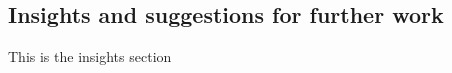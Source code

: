 \subsection{Insights and suggestions for further work}
\label{ssec:insights-and-suggestions}
This is the insights section